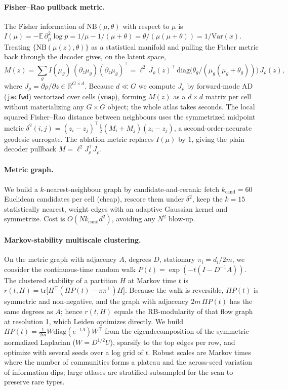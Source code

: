 \documentclass[11pt]{article}
\begin{document}
\paragraph{Fisher--Rao pullback metric.} The Fisher information of $\mathrm{NB}(\mu,\theta)$ with
respect to $\mu$ is $I(\mu)=-\mathbb{E}\,\partial_\mu^2\log p = 1/\mu - 1/(\mu+\theta) =
\theta/(\mu(\mu+\theta)) = 1/\mathrm{Var}(x)$. Treating $\{\mathrm{NB}(\mu(z),\theta)\}$ as a
statistical manifold and pulling the Fisher metric back through the decoder gives, on the latent space,
\[
  M(z)=\sum_g I(\mu_g)\,(\partial_z \mu_g)(\partial_z \mu_g)^{\!\top}
      =\ell^2\, J_\rho(z)^{\!\top}\,\mathrm{diag}\!\big(\theta_g/(\mu_g(\mu_g+\theta_g))\big)\,J_\rho(z),
\]
where $J_\rho=\partial\rho/\partial z\in\mathbb{R}^{G\times d}$. Because $d\ll G$ we compute $J_\rho$ by
forward-mode AD (\texttt{jacfwd}) vectorized over cells (\texttt{vmap}), forming $M(z)$ as a $d\times d$
matrix per cell without materializing any $G\times G$ object; the whole atlas takes seconds. The local
squared Fisher--Rao distance between neighbours uses the symmetrized midpoint metric
$\delta^2(i,j)=(z_i-z_j)^{\!\top}\tfrac12(M_i+M_j)(z_i-z_j)$, a second-order-accurate geodesic
surrogate. The ablation metric replaces $I(\mu)$ by $1$, giving the plain decoder pullback
$M=\ell^2 J_\rho^{\!\top}J_\rho$.

\paragraph{Metric graph.} We build a $k$-nearest-neighbour graph by candidate-and-rerank: fetch
$k_{\text{cand}}\!=\!60$ Euclidean candidates per cell (cheap), rescore them under $\delta^2$, keep the
$k=15$ statistically nearest, weight edges with an adaptive Gaussian kernel and symmetrize. Cost is
$O(N k_{\text{cand}} d^2)$, avoiding any $N^2$ blow-up.

\paragraph{Markov-stability multiscale clustering.} On the metric graph with adjacency $A$, degrees
$D$, stationary $\pi_i=d_i/2m$, we consider the continuous-time random walk $P(t)=\exp(-t(I-D^{-1}A))$.
The clustered stability of a partition $H$ at Markov time $t$ is
$r(t,H)=\mathrm{tr}\!\big[H^{\!\top}(\Pi P(t)-\pi\pi^{\!\top})H\big]$. Because the walk is reversible,
$\Pi P(t)$ is symmetric and non-negative, and the graph with adjacency $2m\,\Pi P(t)$ has the same
degrees as $A$; hence $r(t,H)$ equals the RB-modularity of that flow graph at resolution 1, which
Leiden optimizes directly. We build $\Pi P(t)=\tfrac1{2m}W\mathrm{diag}(e^{-t\Lambda})W^{\!\top}$ from
the eigendecomposition of the symmetric normalized Laplacian ($W=D^{1/2}U$), sparsify to the top edges
per row, and optimize with several seeds over a log grid of $t$. Robust scales are Markov times where
the number of communities forms a plateau and the across-seed variation of information
\citep{meila2007comparing} dips; large atlases are stratified-subsampled for the scan to preserve rare
types.
\end{document}
